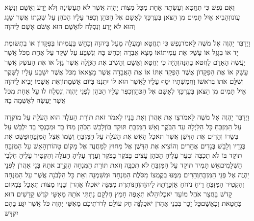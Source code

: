 \documentclass[../main/main.tex]{subfiles}
\begin{document}
\begin{multicols*}{\ncols}
וְאִם נֶפֶשׁ כִּי תֶחֱטָא וְעָשְׂתָה אַחַת מִכָּל מִצְוֺת יַהְוֶה אֲשֶׁר לֹא תֵעָשֶׂינָה וְלֹא יָדַע וְאָשֵׁם וְנָשָׂא עֲוֺנוֹ\PreVerseSpace{}וְהֵבִיא אַיִל תָּמִים מִן הַצֹּאן בְּעַרְכַּךְ\SubEnd{} לְאָשָׁם אֶל הַכֹּהֵן וְכִפֶּר עָלָיו הַכֹּהֵן עַל שִׁגְגָתוֹ אֲשֶׁר שָׁגָג וְהוּא לֹא יָדַע וְנִסְלַח לוֹ\PreVerseSpace{}אָשָׁם הוּא אָשֹׁם אָשַׁם לַיהוָה\OpenSection{}\par
{}וַיְדַבֵּר יַהְוֶה אֶל מֹשֶׁה לֵּאמֹר\PreVerseSpace{}נֶפֶשׁ כִּי תֶחֱטָא וּמָעֲלָה מַעַל בַּיהוָה וְכִחֵשׁ בַּעֲמִיתוֹ בְּפִקָּדוֹן אוֹ בִתְשׂוּמֶת יָד אוֹ בְגָזֵל אוֹ עָשַׁק אֶת עֲמִיתוֹ\PreVerseSpace{}אוֹ מָצָא אֲבֵדָה וְכִחֶשׁ בָּהּ וְנִשְׁבַּע עַל שָׁקֶר עַל אַחַת מִכֹּל אֲשֶׁר יַעֲשֶׂה הָאָדָם לַחֲטֹא בָהֵנָּה\PreVerseSpace{}וְהָיָה כִּי יֶחֱטָא וְאָשֵׁם וְהֵשִׁיב אֶת הַגְּזֵלָה אֲשֶׁר גָּזָל אוֹ אֶת הָעֹשֶׁק אֲשֶׁר עָשָׁק אוֹ אֶת הַפִּקָּדוֹן אֲשֶׁר הָפְקַד אִתּוֹ אוֹ אֶת הָאֲבֵדָה אֲשֶׁר מָצָא\PreVerseSpace{}אוֹ מִכֹּל אֲשֶׁר יִשָּׁבַע עָלָיו לַשֶּׁקֶר וְשִׁלַּם אֹתוֹ בְּרֹאשׁוֹ וַחֲמִשִׁתָיו יֹסֵף עָלָיו לַאֲשֶׁר הוּא לוֹ יִתְּנֶנּוּ בְּיוֹם אַשְׁמָתוֹ\PreVerseSpace{}וְאֶת אֲשָׁמוֹ יָבִיא לַיהוָה אַיִל תָּמִים מִן הַצֹּאן בְּעַרְכַּךְ\SubEnd{} לְאָשָׁם אֶל הַכֹּהֵן\PreVerseSpace{}וְכִפֶּר עָלָיו הַכֹּהֵן לִפְנֵי יַהְוֶה וְנִסְלַח לוֹ עַל אַחַת מִכֹּל אֲשֶׁר יַעֲשֶׂה לְאַשְׁמָה בָהּ\OpenSection{}\par
{}וַיְדַבֵּר יַהְוֶה אֶל מֹשֶׁה לֵּאמֹר\PreVerseSpace{}צַו אֶת אַהֲרֹן וְאֶת בָּנָיו לֵאמֹר זֹאת תּוֹרַת הָעֹלָה הוּא הָעֹלָה עַל מוֹקְדָה עַל הַמִּזְבֵּחַ כָּל הַלַּיְלָה עַד הַבֹּקֶר וְאֵשׁ הַמִּזְבֵּחַ תּוּקַד בּוֹ\PreVerseSpace{}וְלָבַשׁ הַכֹּהֵן מִדּוֹ בַד וּמִכְנְסֵי בַד יִלְבַּשׁ עַל בְּשָׂרוֹ וְהֵרִים אֶת הַדֶּשֶׁן אֲשֶׁר תֹּאכַל הָאֵשׁ אֶת הָעֹלָה עַל הַמִּזְבֵּחַ וְשָׂמוֹ אֵצֶל הַמִּזְבֵּחַ\PreVerseSpace{}וּפָשַׁט אֶת בְּגָדָיו וְלָבַשׁ בְּגָדִים אֲחֵרִים וְהוֹצִיא אֶת הַדֶּשֶׁן אֶל מִחוּץ לַמַּחֲנֶה אֶל מָקוֹם טָהוֹר\PreVerseSpace{}וְהָאֵשׁ עַל הַמִּזְבֵּחַ תּוּקַד בּוֹ לֹא תִכְבֶּה וּבִעֵר עָלֶיהָ הַכֹּהֵן עֵצִים בַּבֹּקֶר בַּבֹּקֶר וְעָרַךְ עָלֶיהָ הָעֹלָה וְהִקְטִיר עָלֶיהָ חֶלְבֵי הַשְּׁלָמִים\PreVerseSpace{}אֵשׁ תָּמִיד תּוּקַד עַל הַמִּזְבֵּחַ לֹא תִכְבֵֶּה \ClosedSection{}וְזֹאת תּוֹרַת הַמִּנְחָה הַקְרֵב אֹתָהּ בְּנֵי אַהֲרֹן לִפְנֵי יַהְוֶה אֶל פְּנֵי הַמִּזְבֵּחַ\PreVerseSpace{}וְהֵרִים מִמֶּנּוּ בְּקֻמְצוֹ מִסֹּלֶת הַמִּנְחָה וּמִשַּׁמְנָהּ וְאֵת כָּל הַלְּבֹנָה אֲשֶׁר עַל הַמִּנְחָה וְהִקְטִיר הַמִּזְבֵּחַ רֵיחַ נִיחֹחַ אַזְכָּרָתָהּ לַיהוָה\PreVerseSpace{}וְהַנּוֹתֶרֶת מִמֶּנָּה יֹאכְלוּ אַהֲרֹן וּבָנָיו מַצּוֹת תֵּאָכֵל בְּמָקוֹם קָדֹשׁ בַּחֲצַר אֹהֶל מוֹעֵד יֹאכְלוּהָ\PreVerseSpace{}לֹא תֵאָפֶה חָמֵץ חֶלְקָם נָתַתִּי אֹתָהּ מֵאִשָּׁי קֹדֶשׁ קָדָשִׁים הוּא כַּחַטָּאת וְכָאָשָׁם\PreVerseSpace{}כָּל זָכָר בִּבְנֵי אַהֲרֹן יֹאכֲלֶנָּה חָק עוֹלָם לְדֹרֹתֵיכֶם מֵאִשֵּׁי יַהְוֶה כֹּל אֲשֶׁר יִגַּע בָּהֶם יִקְדָּשׁ\OpenSection{}\par

\end{multicols*}
\end{document}

